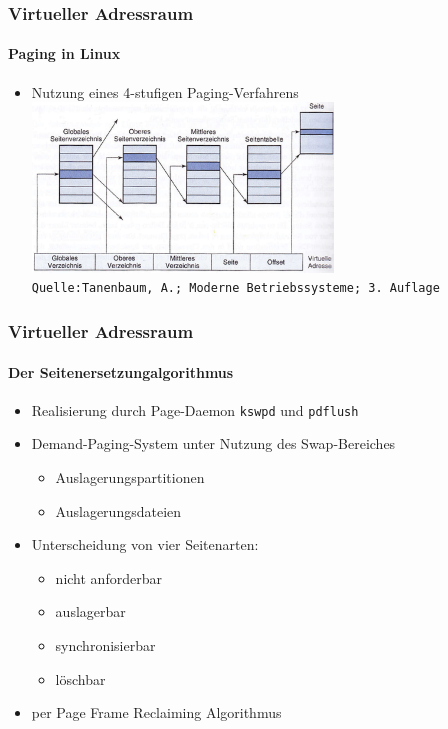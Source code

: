 \documentclass[ddcfooter,nosectionnum]{tudbeamer}
\begin{document}
\begin{frame}
    \frametitle{Virtueller Adressraum}
    \framesubtitle {Paging in Linux}
    \begin{itemize}
         \item Nutzung eines 4-stufigen Paging-Verfahrens         
    	  \includegraphics[width=8cm]{vierstufiges.png}\\
    	  \texttt{\tiny Quelle:Tanenbaum, A.; Moderne Betriebssysteme; 3. Auflage}\\
     \end{itemize}
\end{frame}


\begin{frame} 
    \frametitle {Virtueller Adressraum}
    \framesubtitle {Der Seitenersetzungalgorithmus}
    \begin{itemize}
    	\item Realisierung durch Page-Daemon \texttt{kswpd} und \texttt{pdflush}
	 	\item Demand-Paging-System unter Nutzung des Swap-Bereiches
	 	\begin{itemize}
	 		\item Auslagerungspartitionen 
			\item Auslagerungsdateien
		\end{itemize}
		\item Unterscheidung von vier Seitenarten:
		\begin{itemize}
			\item nicht anforderbar
			\item auslagerbar
			\item synchronisierbar
			\item löschbar
		\end{itemize}	
		\item per Page Frame Reclaiming Algorithmus
	\end{itemize}	
\end{frame}
\end{document}
